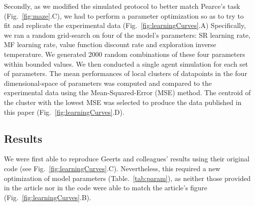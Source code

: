 Secondly, as we modified the simulated protocol to better match Pearce's task (Fig.~\ref{fig:maze}.C), we had to  perform a parameter optimization so as to try to fit and replicate the experimental data (Fig.~\ref{fig:learningCurves}.A) Specifically, we ran a random grid-search on four of the model's parameters: SR learning rate, MF learning rate, value function discount rate and exploration inverse temperature. We generated 2000 random combinations of these four parameters within bounded values. We then conducted a single agent simulation for each set of parameters. The mean performances of local clusters of datapoints in the four dimensional-space of parameters was computed and compared to the experimental data using the Mean-Squared-Error (MSE) method. The centroid of the cluster with the lowest MSE was selected to produce the data published in this paper (Fig.~\ref{fig:learningCurves}.D).

\subsection{Results}





We were first able to reproduce Geerts and colleagues' results using their original code (see Fig.~\ref{fig:learningCurves}.C). Nevertheless, this required a new optimization of model parameters (Table.~\ref{tab:param}), as neither those provided in the article nor in the code were able to match the article's figure (Fig.~\ref{fig:learningCurves}.B). 


